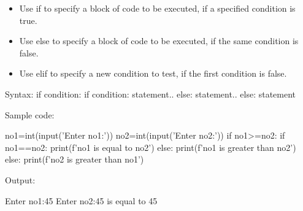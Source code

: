 \setlength{\columnsep}{3pt}
\begin{flushleft}
	
	\begin{itemize}
		\item Use if to specify a block of code to be executed, if a specified condition is true.
		\item Use else to specify a block of code to be executed, if the same condition is false.
		\item Use elif to specify a new condition to test, if the first condition is false.
	\end{itemize}
	
	
	\begin{tcolorbox}[breakable,notitle,boxrule=1pt,colback=pink,colframe=pink]
		\color{black}
		\font=8pt
		Syntax: 
		\newline
		if condition:
 \newline
		\hphantom{} \hphantom{}  if condition: \newline
		\hphantom{} \hphantom{} \hphantom{} \hphantom{} statement.. \newline
		\hphantom{} \hphantom{} else: \newline
		\hphantom{} \hphantom{} \hphantom{} \hphantom{} statement.. \newline
		else: \newline
		\hphantom{} \hphantom{} statement
		\font=4pt
	\end{tcolorbox}
	
	Sample code:
	\begin{tcolorbox}[breakable,notitle,boxrule=-0pt,colback=code,colframe=code]
		\color{white}
		\font=8pt
		no1=int(input('Enter no1:')) \newline
		no2=int(input('Enter no2:')) \newline
		\newline
		if no1>=no2:    \newline
		\hphantom{} \hphantom{} if no1==no2: \newline
		\hphantom{} \hphantom{} \hphantom{} \hphantom{} print(f'{no1} is equal to {no2}') \newline
		\hphantom{} \hphantom{} else: \newline
		\hphantom{} \hphantom{} \hphantom{} \hphantom{} print(f'{no1} is greater than {no2}')\newline
		else: \newline
		\hphantom{} \hphantom{} print(f'{no2} is greater than {no1}')
		\font=4pt
	\end{tcolorbox}
	
	Output:
	\begin{tcolorbox}[breakable,notitle,boxrule=-0pt,colback=output,colframe=output]
		\color{black}
		Enter no1:45 \newline
		Enter no2:45  is equal to 45
		\font=4pt
	\end{tcolorbox}
	
	
	
	
	
\end{flushleft}

\newpage

